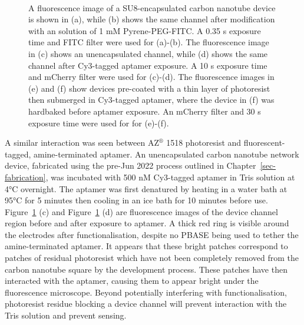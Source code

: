 \documentclass[
  a4paper,
]{scrbook}
\begin{document}
\begin{figure}
\begin{minipage}[t]{0.45\linewidth}
{{}

}

\end{minipage}%
%
\begin{minipage}[t]{0.01\linewidth}

{\centering 

~

}

\end{minipage}%

\caption{\label{fig-photoresist-contamination}A fluorescence image of a
SU8-encapsulated carbon nanotube device is shown in (a), while (b) shows
the same channel after modification with an solution of 1 mM
Pyrene-PEG-FITC. A 0.35 s exposure time and FITC filter were used for
(a)-(b). The fluorescence image in (c) shows an unencapsulated channel,
while (d) shows the same channel after Cy3-tagged aptamer exposure. A 10
s exposure time and mCherry filter were used for (c)-(d). The
fluorescence images in (e) and (f) show devices pre-coated with a thin
layer of photoresist then submerged in Cy3-tagged aptamer, where the
device in (f) was hardbaked before aptamer exposure. An mCherry filter
and 30 s exposure time were used for for (e)-(f).}

\end{figure}

A similar interaction was seen between AZ\(^\circledR\) 1518 photoresist
and fluorescent-tagged, amine-terminated aptamer. An unencapsulated
carbon nanotube network device, fabricated using the pre-Jun 2022
process outlined in Chapter~\ref{sec-fabrication}, was incubated with
500 nM Cy3-tagged aptamer in Tris solution at 4°C overnight. The aptamer
was first denatured by heating in a water bath at 95°C for 5 minutes
then cooling in an ice bath for 10 minutes before use.
Figure~\ref{fig-photoresist-contamination} (c) and
Figure~\ref{fig-photoresist-contamination} (d) are fluorescence images
of the device channel region before and after exposure to aptamer. A
thick red ring is visible around the electrodes after functionalisation,
despite no PBASE being used to tether the amine-terminated aptamer. It
appears that these bright patches correspond to patches of residual
photoresist which have not been completely removed from the carbon
nanotube square by the development process. These patches have then
interacted with the aptamer, causing them to appear bright under the
fluorescence microscope. Beyond potentially interfering with
functionalisation, photoresist residue blocking a device channel will
prevent interaction with the Tris solution and prevent sensing.
\end{document}
